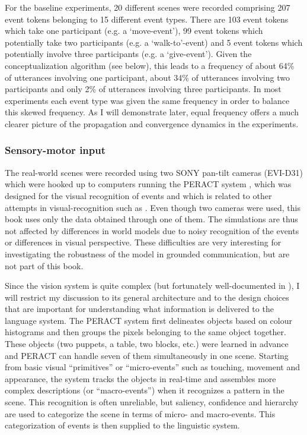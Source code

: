 For the baseline experiments, 20 different scenes were recorded comprising 207 event tokens belonging to 15 different event types. There are 103 event tokens which take one participant (e.g. a `move-event'), 99 event tokens which potentially take two participants (e.g. a `walk-to'-event) and 5 event tokens which potentially involve three participants (e.g. a `give-event'). Given the conceptualization algorithm (see below), this leads to a frequency of about 64\% of utterances involving one participant, about 34\% of utterances involving two participants and only 2\% of utterances involving three participants. In most experiments each event type was given the same frequency in order to balance this skewed frequency. As I will demonstrate later, equal frequency offers a much clearer picture of the propagation and convergence dynamics in the experiments.


\subsubsection{Sensory-motor input}
 The real-world scenes were recorded using two SONY pan-tilt cameras (EVI-D31) which were hooked up to computers running the PERACT system \citep{baillie00action, steels03shared}, which was designed for the visual recognition of events and which is related to other attempts in visual-recognition such as \citet{siskind00visual}. Even though two cameras were used, this book uses only the data obtained through one of them. The simulations are thus not affected by differences in world models due to noisy recognition of the events or differences in visual perspective. These difficulties are very interesting for investigating the robustness of the model in grounded communication, but are not part of this book.

Since the vision system is quite complex (but fortunately well-documented in \citealp{baillie00action}), I will restrict my discussion to its general architecture and to the design choices that are important for understanding what information is delivered to the language system. The PERACT system first delineates objects based on colour histograms and then groups the pixels belonging to the same object together. These objects (two puppets, a table, two blocks, etc.) were learned in advance and PERACT can handle seven of them simultaneously in one scene. Starting from basic visual ``primitives'' or ``micro-events'' such as touching, movement and appearance, the system tracks the objects in real-time and assembles more complex descriptions (or ``macro-events'') when it recognizes a pattern in the scene. This recognition is often unreliable, but saliency, confidence and hierarchy are used to categorize the scene in terms of micro- and macro-events. This categorization of events is then supplied to the linguistic system.

